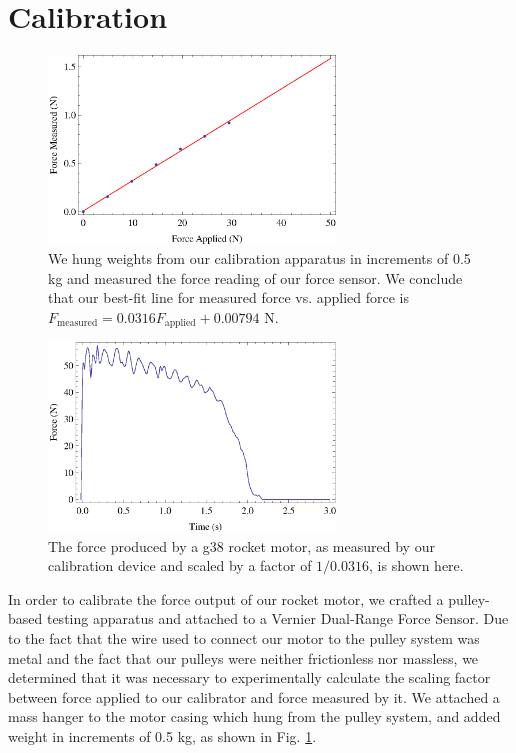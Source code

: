 \documentclass[aps,pra,twocolumn]{revtex4-1}
\begin{document}
\section{\label{section 3} Calibration}
\begin{figure} [t!]
	\includegraphics[width=3in]{calibration_Plot.eps}
	\caption{We hung weights from our calibration apparatus in increments of 0.5 kg and measured the force reading of our force sensor.  We conclude that our best-fit line for measured force vs. applied force is $F_\text{measured} = 0.0316F_\text{applied} + 0.00794$ N.\label{calibrationPlot}}
\end{figure}
\begin{figure} [b!]
	\includegraphics[width=3in]{G38-scaledTest.eps}
	\caption{The force produced by a g38 rocket motor, as measured by our calibration device and scaled by a factor of $1/0.0316$, is shown here.\label{thrustPlot}}
\end{figure}

In order to calibrate the force output of our rocket motor, we crafted a pulley-based testing apparatus and attached to a Vernier Dual-Range Force Sensor.  Due to the fact that the wire used to connect our motor to the pulley system was metal and the fact that our pulleys were neither frictionless nor massless, we determined that it was necessary to experimentally calculate the scaling factor between force applied to our calibrator and force measured by it.  We attached a mass hanger to the motor casing which hung from the pulley system, and added weight in increments of 0.5 kg, as shown in Fig. \ref{calibrationPlot}.   
\end{document}
